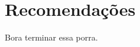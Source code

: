 \documentclass[
	12pt,				%
	openright,			%
	twoside,			%
	a4paper,			%
	english,			%
	french,				%
	spanish,			%
	brazil				%
	]{abntex2}
\begin{document}
\chapter{Recomendações}

Bora terminar essa porra.

\postextual



%
%

\end{document}
